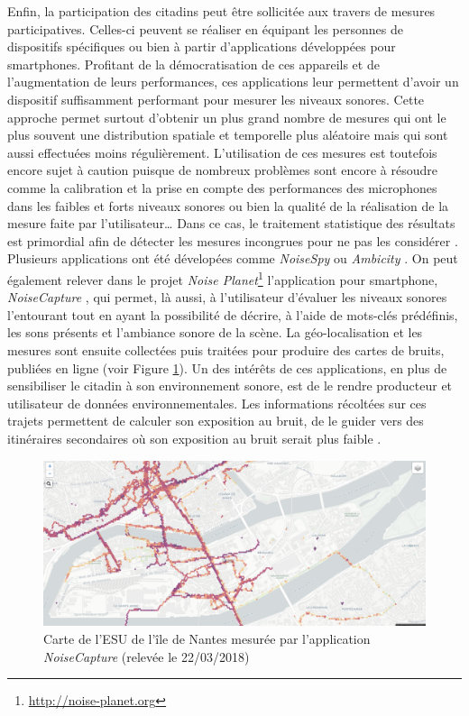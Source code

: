 Enfin, la participation des citadins peut être sollicitée aux travers de mesures participatives. Celles-ci peuvent se réaliser en équipant les personnes de dispositifs spécifiques \cite{delaitre2014influence} ou bien à partir d'applications développées pour smartphones. Profitant de la démocratisation de ces appareils et de l'augmentation de leurs performances, ces applications leur permettent d'avoir un dispositif suffisamment performant pour mesurer les niveaux sonores. Cette approche permet surtout d'obtenir un plus grand nombre de mesures qui ont le plus souvent une distribution spatiale et temporelle plus aléatoire mais qui sont aussi effectuées moins régulièrement. L'utilisation de ces mesures est toutefois encore sujet à caution puisque de nombreux problèmes sont encore à résoudre comme la calibration et la prise en compte des performances des microphones dans les faibles et forts niveaux sonores \cite{aumond2017study} ou bien la  qualité de la réalisation de la mesure faite par l'utilisateur\dots{} Dans ce cas, le traitement statistique des résultats est primordial afin de détecter les mesures incongrues pour ne pas les considérer \cite{guillaume2016noise}. Plusieurs applications ont été dévelopées comme \textit{NoiseSpy} \cite{kanjo_noisespy_2010} ou \textit{Ambicity} \cite{ventura2017estimation}. On peut également relever dans le projet \textit{Noise Planet}\footnote{\url{http://noise-planet.org}} l'application pour smartphone, \textit{NoiseCapture} \cite{guillaume2016noise}, qui permet, là aussi, à l'utilisateur d'évaluer les niveaux sonores l'entourant tout en ayant la possibilité de décrire, à l'aide de mots-clés prédéfinis, les sons présents et l'ambiance sonore de la scène. La géo-localisation et les mesures sont ensuite collectées puis traitées pour produire des cartes de bruits, publiées en ligne (voir Figure \ref{fig:carte_noiseModelling}). Un des intérêts de ces applications, en plus de sensibiliser le citadin à son environnement sonore, est de le rendre producteur et utilisateur de données environnementales. Les informations récoltées sur ces trajets permettent de calculer son exposition au bruit, de le guider vers des itinéraires secondaires où son exposition au bruit serait plus faible \cite{aumond2016sound}.\\

\begin{figure}[t]
\centering
\includegraphics[width=0.7\linewidth]{./figures/cartographie/noise_modelling.PNG}
\caption{Carte de l'ESU de l'île de Nantes mesurée par l'application \textit{NoiseCapture}  (relevée le 22/03/2018)}
\label{fig:carte_noiseModelling}
\end{figure}

